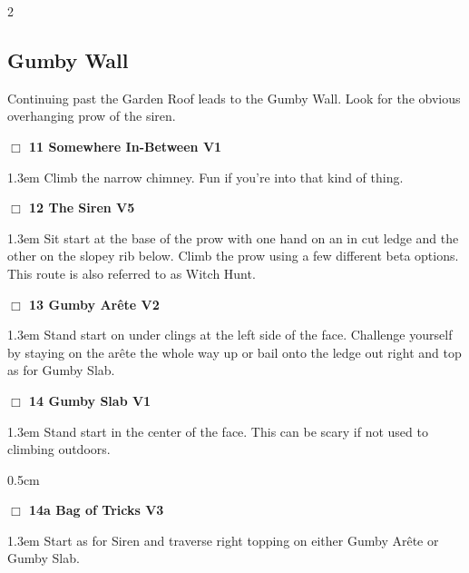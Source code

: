 	\begin{multicols}{2}
\needspace{10em}
\subsection*{Gumby Wall}\label{bf:Gumby Wall}
Continuing past the Garden Roof leads to the Gumby Wall. Look for the obvious overhanging prow of the siren.\\
\needspace{2em}
\label{rt:Somewhere In-Between}
\colorbox{green!20}{
\parbox{0.95\linewidth}{
\hspace{-1ex}\textbf{$\Box$
11 Somewhere In-Between V1  
}}}
\begin{adjustwidth}{1.3em}{}			
Climb the narrow chimney. Fun if you're into that kind of thing.
\end{adjustwidth}
\needspace{2em}
\label{rt:The Siren}
\colorbox{RoyalBlue!20}{
\parbox{0.95\linewidth}{
\hspace{-1ex}\textbf{$\Box$
12 The Siren V5  
}}}
\begin{adjustwidth}{1.3em}{}			
Sit start at the base of the prow with one hand on an in cut ledge and the other on the slopey rib below. Climb the prow using a few different beta options. This route is also referred to as Witch Hunt.
\end{adjustwidth}
\needspace{2em}
\label{rt:Gumby Arête}
\colorbox{green!20}{
\parbox{0.95\linewidth}{
\hspace{-1ex}\textbf{$\Box$
13 Gumby Arête V2  
}}}
\begin{adjustwidth}{1.3em}{}			
Stand start on under clings at the left side of the face. Challenge yourself by staying on the arête the whole way up or bail onto the ledge out right and top as for Gumby Slab.
\end{adjustwidth}
\needspace{2em}
\label{rt:Gumby Slab}
\colorbox{green!20}{
\parbox{0.95\linewidth}{
\hspace{-1ex}\textbf{$\Box$
14 Gumby Slab V1  
}}}
\begin{adjustwidth}{1.3em}{}			
Stand start in the center of the face. This can be scary if not used to climbing outdoors.
\end{adjustwidth}
\begin{adjustwidth}{0.5cm}{}				
\needspace{4em}
\needspace{2em}
\label{vr:Bag of Tricks}
\colorbox{green!20}{
\parbox{0.95\linewidth}{
\hspace{-1ex}\textbf{$\Box$
14a Bag of Tricks V3  
}}}
\begin{adjustwidth}{1.3em}{}			
Start as for Siren and traverse right topping on either Gumby Arête or Gumby Slab.
\end{adjustwidth}
\end{adjustwidth}
\needspace{10em}

\end{multicols}
